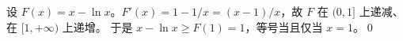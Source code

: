 设 $F(x)=x-\ln x$。$F'(x)=1-1/x=(x-1)/x$，故 $F$ 在 $(0,1]$ 上递减、在 $[1,+\infty)$ 上递增。
于是 $\boxed{x-\ln x\ge F(1)=1}$，等号当且仅当 $x=1$。\qed
